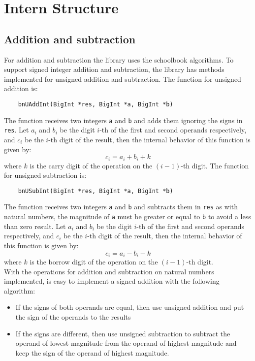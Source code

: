 \documentclass{book}
\begin{document}
\chapter{Intern Structure}

\section{Addition and subtraction}
For addition and subtraction the library uses the schoolbook algorithms. To support signed integer addition and subtraction, the library has methods implemented for unsigned addition and subtraction. The function for unsigned addition is:
    \begin{verbatim}
    bnUAddInt(BigInt *res, BigInt *a, BigInt *b)
    \end{verbatim}
The function receives two integers \verb+a+ and \verb+b+ and adds them ignoring the signs in \verb+res+. Let $a_i$ and $b_i$ be the digit $i$-th of the first and second operands respectively, and $c_i$ be the $i$-th digit of the result, then the internal behavior of this function is given by:
\[c_i = a_i + b_i + k \]
where $k$ is the carry digit of the operation on the $(i-1)$-th digit. The function for unsigned subtraction is:
    \begin{verbatim}
    bnUSubInt(BigInt *res, BigInt *a, BigInt *b)
    \end{verbatim}
The function receives two integers \verb+a+ and \verb+b+ and subtracts them in \verb+res+ as with natural numbers, the magnitude of \verb+a+ must be greater or equal to \verb+b+ to avoid a less than zero result. Let $a_i$ and $b_i$ be the digit $i$-th of the first and second operands respectively, and $c_i$ be the $i$-th digit of the result, then the internal behavior of this function is given by:
\[c_i = a_i - b_i - k \]
where $k$ is the borrow digit of the operation on the $(i-1)$-th digit. \\

With the operations for addition and subtraction on natural numbers implemented, is easy to implement a signed addition with the following algorithm:
\begin{itemize}
\item If the signs of both operands are equal, then use unsigned addition and put the sign of the operands to the results
\item If the signs are different, then use unsigned subtraction to subtract the operand of lowest magnitude from the operand of highest magnitude and keep the sign of the operand of highest magnitude.
\end{itemize}
\end{document}

